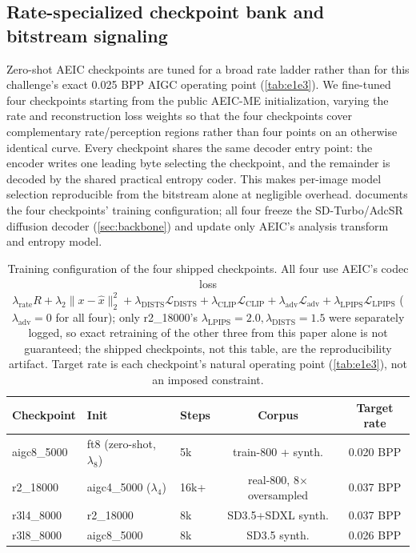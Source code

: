 \documentclass[runningheads]{llncs}
\begin{document}
\subsection{Rate-specialized checkpoint bank and bitstream signaling}
Zero-shot AEIC checkpoints are tuned for a broad rate ladder rather than for this challenge's exact 0.025 BPP AIGC operating point (\cref{tab:e1e3}). We fine-tuned four checkpoints starting from the public AEIC-ME initialization, varying the rate and reconstruction loss weights so that the four checkpoints cover complementary rate/perception regions rather than four points on an otherwise identical curve. Every checkpoint shares the same decoder entry point: the encoder writes one leading byte selecting the checkpoint, and the remainder is decoded by the shared practical entropy coder. This makes per-image model selection reproducible from the bitstream alone at negligible overhead.  documents the four checkpoints' training configuration; all four freeze the SD-Turbo/AdcSR diffusion decoder (\cref{sec:backbone}) and update only AEIC's analysis transform and entropy model.

\begin{table}[t]
\centering\scriptsize
\begin{tabular}{@{}lllcc@{}}
\toprule
Checkpoint & Init & Steps & Corpus & Target rate \\
\midrule
aigc8\_5000 & ft8 (zero-shot, $\lambda_8$) & 5k & train-800 + synth. & 0.020 BPP \\
r2\_18000 & aigc4\_5000 ($\lambda_4$) & 16k+ & real-800, 8$\times$ oversampled & 0.037 BPP \\
r3l4\_8000 & r2\_18000 & 8k & SD3.5+SDXL synth. & 0.037 BPP \\
r3l8\_8000 & aigc8\_5000 & 8k & SD3.5 synth. & 0.026 BPP \\
\bottomrule
\end{tabular}
\caption{Training configuration of the four shipped checkpoints. All four use AEIC's codec loss $\lambda_{\mathrm{rate}}R+\lambda_{2}\|x{-}\hat x\|_2^2+\lambda_{\mathrm{DISTS}}\mathcal{L}_{\mathrm{DISTS}}+\lambda_{\mathrm{CLIP}}\mathcal{L}_{\mathrm{CLIP}}+\lambda_{\mathrm{adv}}\mathcal{L}_{\mathrm{adv}}+\lambda_{\mathrm{LPIPS}}\mathcal{L}_{\mathrm{LPIPS}}$ ($\lambda_{\mathrm{adv}}{=}0$ for all four); only r2\_18000's $\lambda_{\mathrm{LPIPS}}{=}2.0,\lambda_{\mathrm{DISTS}}{=}1.5$ were separately logged, so exact retraining of the other three from this paper alone is not guaranteed; the shipped checkpoints, not this table, are the reproducibility artifact. Target rate is each checkpoint's natural operating point (\cref{tab:e1e3}), not an imposed constraint.}
\label{tab:ckpts}
\end{table}
\end{document}
